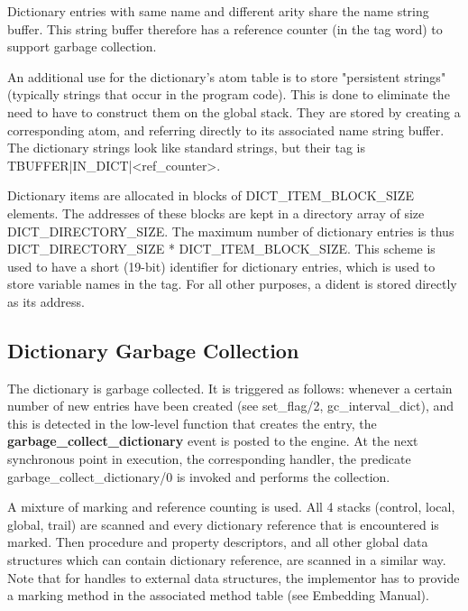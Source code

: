 Dictionary entries with same name and different arity share the name
string buffer. This string buffer therefore has a reference counter
(in the tag word) to support garbage collection.

An additional use for the dictionary's atom table is to store
"persistent strings" (typically strings that occur in the program
code).  This is done to eliminate the need to have to construct them
on the global stack.  They are stored by creating a corresponding
atom, and referring directly to its associated name string buffer.
The dictionary strings look like standard strings, but their tag is
TBUFFER|IN_DICT|<ref_counter>.

Dictionary items are allocated in blocks of DICT_ITEM_BLOCK_SIZE elements.
The addresses of these blocks are kept in a directory array of size
DICT_DIRECTORY_SIZE. The maximum number of dictionary entries is thus
DICT_DIRECTORY_SIZE * DICT_ITEM_BLOCK_SIZE.
This scheme is used to have a short (19-bit) identifier
for dictionary entries, which is used to store variable names in the tag.
For all other purposes, a dident is stored directly as its address.



\subsection{Dictionary Garbage Collection}
The dictionary is garbage collected. It is triggered as follows:
whenever a certain number of new entries have been created
(see set_flag/2, gc_interval_dict), and this is detected in the low-level
function that creates the entry, the {\bf garbage_collect_dictionary} event
 is posted to the engine.
At the next synchronous point in execution, the corresponding handler,
the predicate garbage_collect_dictionary/0 is invoked and performs the
collection.

A mixture of marking and reference counting is used. 
All 4 stacks  (control, local, global, trail) are scanned and every
dictionary reference that is encountered is marked. Then procedure and
property descriptors, and all other global data structures which can contain
dictionary reference, are scanned in a similar way. Note that for
handles to external data structures, the implementor has to provide
a marking method in the associated method table (see Embedding Manual).

